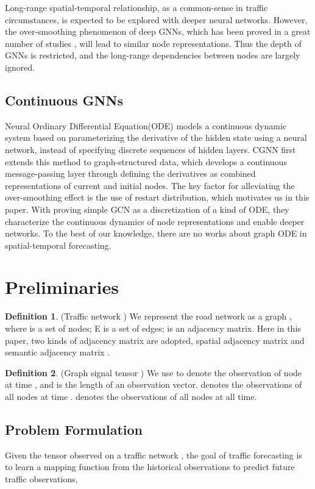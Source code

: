 \documentclass[sigconf]{acmart}
\theoremstyle{definition}
\newtheorem{defn}{Definition}
\begin{document}
 Long-range spatial-temporal relationship, as a common-sense in traffic circumstances, is expected to be explored with deeper neural networks.
 However, the over-smoothing phenomenon of deep GNNs, which has been proved in a great number of studies \cite{zhou2018graph, li2018deeper}, will
 lead to similar node representations.
Thus the depth of GNNs is restricted, and the long-range dependencies between nodes are largely ignored.


 \subsection{Continuous GNNs}
 Neural Ordinary Differential Equation(ODE) \cite{chen2018neural} models a continuous dynamic system based on parameterizing the derivative of the hidden state using a neural network, instead of specifying discrete sequences of hidden layers. CGNN \cite{xhonneux2020continuous} first extends this method to graph-structured data, which develops a continuous message-passing layer through defining the derivatives as combined representations of current and initial nodes. The key factor for alleviating the over-smoothing effect is the use of restart distribution, which motivates us in this paper. With proving simple GCN as a discretization of a kind of ODE, they characterize the continuous dynamics of node representations and enable deeper networks. To the best of our knowledge, there are no works about graph ODE in spatial-temporal forecasting.


\section{Preliminaries}
\begin{defn}
(Traffic network ) We represent the road network as a graph , where  is a set of  nodes; E is a set of edges;  is an adjacency matrix. Here in this paper, two kinds of adjacency matrix are adopted, spatial adjacency matrix  and semantic adjacency matrix .
\end{defn}
\begin{defn}
(Graph signal tensor ) We use  to denote the observation of node  at time , and  is the length of an observation vector.  denotes the observations of all nodes at time .  denotes the observations of all nodes at all time.
\end{defn}


\subsection{Problem Formulation}
Given the tensor  observed on a traffic network , the goal of traffic forecasting is to learn a mapping function  from the historical  observations to predict future  traffic observations,
\end{document}
